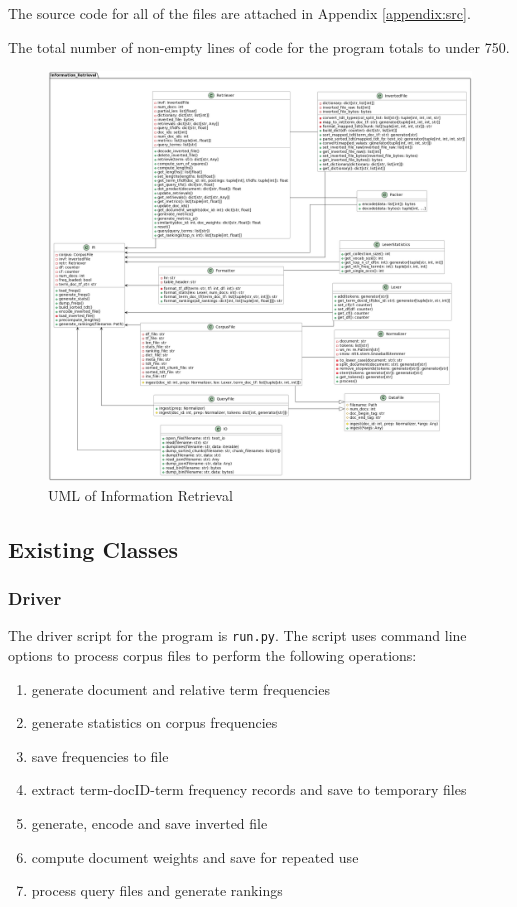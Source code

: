 \documentclass[11pt]{article}
\begin{document}
The source code for all of the files are attached in Appendix \ref{appendix:src}.

The total number of non-empty lines of code for the program totals to under 750.

\begin{figure}[!ht]
    \includegraphics[scale=0.31]{statics/uml.png}
    \centering
    \caption{UML of Information Retrieval}
\end{figure}

\subsection{Existing Classes}

\subsubsection{Driver} \label{sec:driver}
The driver script for the program is \texttt{run.py}. The script uses command line options to process corpus files to perform the following operations:

\begin{enumerate}
    \item generate document and relative term frequencies
    \item generate statistics on corpus frequencies
    \item save frequencies to file
    \item extract term-docID-term frequency records and save to temporary files
    \item generate, encode and save inverted file
    \item compute document weights and save for repeated use
    \item process query files and generate rankings
\end{enumerate}
\end{document}
